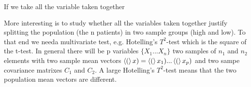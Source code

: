 \documentclass[11pt, onecolumn]{article}
\begin{document}
If we take all the variable taken together 





More interesting is to study whether all the variables taken together justify splitting the population (the n patients) in two sample groups (high and low). To that end we needa multivariate test, e.g. Hotelling's $T^2$-test which is  the square of the t-test.
In general there will be p variables $\{X_1 ... X_n\}$ two samples of $n_1$ and $n_2$ elements with two sample mean vectors $\left< ( \right>x) = \left< ( \right>x_1) ...\left< ( \right>x_p)$ and two sampe covariance matrixes $C_1$ and $C_2$.   A large Hotelling's $T^2$-test means that the two population mean vectors are different. 
\end{document}
